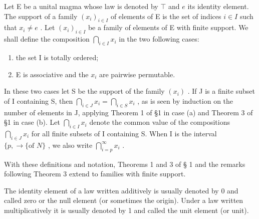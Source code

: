 Let E be a unital magma whose law is denoted by \(\top\) and \(e\) its identity element. The support of a family \((x_{i})_{i\in I}\) of elements of E is the set of indices \(i\in I\) such that \(x_{i}\neq e\) . Let \((x_{i})_{i\in I}\) be a family of elements of E with finite support. We shall define the composition \(\bigcap_{i\in I}x_{i}\) in the two following cases:

\begin{enumerate}
\def\labelenumi{(\alph{enumi})}
\item
  the set I is totally ordered;
\item
  E is associative and the \(x_{i}\) are pairwise permutable.
\end{enumerate}

In these two cases let S be the support of the family \((x_{i})\) . If J is a finite subset of I containing S, then \(\bigcap_{i\in J}x_{i} = \bigcap_{i\in S}x_{i}\) , as is seen by induction on the number of elements in J, applying Theorem 1 of §1 in case (a) and Theorem 3 of §1 in case (b). Let \(\bigcap_{i\in I}x_{i}\) denote the common value of the compositions \(\bigcap_{i\in J}x_{i}\) for all finite subsets of I containing S. When I is the interval \(\{p,\rightarrow\{\text{of }N\}\) , we also write \(\bigcap_{i=p}^{\infty}x_{i}\) .

With these definitions and notation, Theorems 1 and 3 of § 1 and the remarks following Theorem 3 extend to families with finite support.

The identity element of a law written additively is usually denoted by 0 and called zero or the null element (or sometimes the origin). Under a law written multiplicatively it is usually denoted by 1 and called the unit element (or unit).

